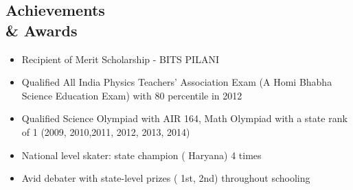 \documentclass[margin,line]{templates/resume}
\newcommand{\compresslist}{%
\setlength{\itemsep}{3pt}%
\setlength{\parskip}{0pt}%
\setlength{\parsep}{0pt}%
}
\begin{document}
\begin{resume}
\vspace{-0.1cm}    
\section{\mysidestyle Achievements\\\& Awards} 
\vspace{0.01cm}
\begin{itemize}[leftmargin=*]\compresslist
\item Recipient of Merit Scholarship - BITS PILANI 
\item Qualified All India Physics Teachers' Association Exam (A Homi Bhabha Science Education Exam) with 80 percentile in 2012
\item Qualified Science Olympiad with AIR 164, Math Olympiad with a state rank of 1 (2009, 2010,2011, 2012, 2013, 2014)
\item National level skater: state champion ( Haryana) 4 times
\item Avid debater with state-level prizes ( 1st, 2nd) throughout schooling
\end{itemize}

\end{resume}
\end{document}
